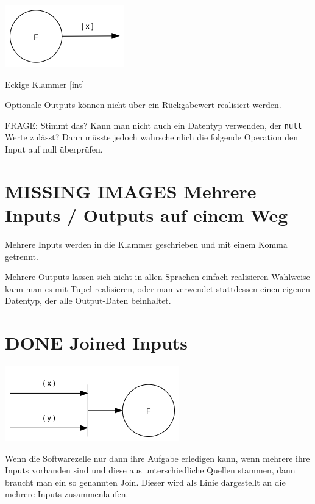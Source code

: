 \documentclass[a4paper,12pt,oneside]{book}
\begin{document}
\includegraphics[width=.9\linewidth]{./img/diagramOptional.png}

Eckige Klammer
[int]

Optionale Outputs können nicht über ein Rückgabewert realisiert werden.

FRAGE: Stimmt das? Kann man nicht auch ein Datentyp verwenden, der \texttt{null} Werte zulässt?
Dann müsste jedoch wahrscheinlich die folgende Operation den Input auf null überprüfen.

\section{MISSING IMAGES Mehrere Inputs / Outputs auf einem Weg}
\label{sec-3-7}
Mehrere Inputs werden in die Klammer geschrieben und mit einem Komma getrennt.

Mehrere Outputs lassen sich nicht in allen Sprachen einfach realisieren
Wahlweise kann man es mit Tupel realisieren, oder man verwendet stattdessen
einen eigenen Datentyp, der alle Output-Daten beinhaltet.

\section{{\bfseries\sffamily DONE} Joined Inputs}
\label{sec-3-8}
\includegraphics[width=.9\linewidth]{./img/diagramJoin.png}

Wenn die Softwarezelle nur dann ihre Aufgabe erledigen kann, wenn mehrere ihre Inputs
vorhanden sind und diese aus unterschiedliche Quellen stammen, dann braucht man ein so genannten Join.
Dieser wird als Linie dargestellt an die mehrere Inputs zusammenlaufen.
\end{document}
